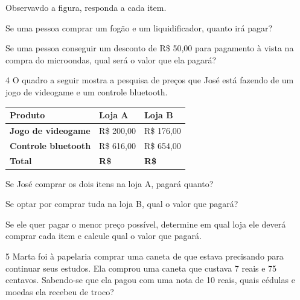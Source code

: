 Observavdo a figura, responda a cada item.

\begin{escolha}
\item Se uma pessoa comprar um fogão e um liquidificador, quanto irá pagar?

\item Se uma pessoa conseguir um desconto de R\$ 50,00 para pagamento à
  vista na compra do microondas, qual será o valor que ela pagará?
\end{escolha}

\num{4} O quadro a seguir mostra a pesquisa de preços que José está fazendo
de um jogo de videogame e um controle bluetooth.

\begin{longtable}[]{@{}lll@{}}
\toprule
\hline
\textbf{Produto} & \textbf{Loja A} & \textbf{Loja B}\tabularnewline
\hline
\midrule
\endhead
\textbf{Jogo de videogame} & R\$ 200,00 & R\$ 176,00\tabularnewline
\hline
\textbf{Controle bluetooth} & R\$ 616,00 & R\$ 654,00\tabularnewline
\hline
\hline
\textbf{Total} & \textbf{R\$} & \textbf{R\$}\tabularnewline
\bottomrule
\end{longtable}

\begin{escolha}
\item Se José comprar os dois itens na loja A, pagará quanto?

\item Se optar por comprar tuda na loja B, qual o valor que pagará?

\item Se ele quer pagar o menor preço possível, determine em qual loja ele
  deverá comprar cada item e calcule qual o valor que pagará.
\end{escolha}

\num{5} Marta foi à papelaria comprar uma caneta de que estava precisando para
continuar seus estudos. Ela comprou uma caneta que custava 7 reais e 75
centavos. Sabendo-se que ela pagou com uma nota de 10 reais, quais
cédulas e moedas ela recebeu de troco?


